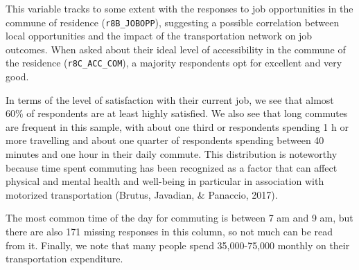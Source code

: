 \documentclass[
11pt, %
oneside, %
english, %
singlespacing, %
]{macthesis} %
\newcommand{\blandscape}{\begin{landscape}}
\newcommand{\elandscape}{\end{landscape}}
\begin{document}
This variable tracks to some extent with the responses to job opportunities in the commune of residence (\texttt{r8B\_JOBOPP}), suggesting a possible correlation between local opportunities and the impact of the transportation network on job outcomes. When asked about their ideal level of accessibility in the commune of the residence (\texttt{r8C\_ACC\_COM}), a majority respondents opt for excellent and very good.

In terms of the level of satisfaction with their current job, we see that almost 60\% of respondents are at least highly satisfied. We also see that long commutes are frequent in this sample, with about one third or respondents spending 1 h or more travelling and about one quarter of respondents spending between 40 minutes and one hour in their daily commute. This distribution is noteworthy because time spent commuting has been recognized as a factor that can affect physical and mental health and well-being in particular in association with motorized transportation (Brutus, Javadian, \& Panaccio, 2017).

The most common time of the day for commuting is between 7 am and 9 am, but there are also 171 missing responses in this column, so not much can be read from it. Finally, we note that many people spend 35,000-75,000 monthly on their transportation expenditure.

\newpage
\blandscape
\begin{table}

\caption{\label{tab:unnamed-chunk-10}\label{tab:Travel-work-Descriptive}Variables regarding the commuting behavior of respondents}
\centering
{}
\end{table}
\elandscape
\newpage
\end{document}
